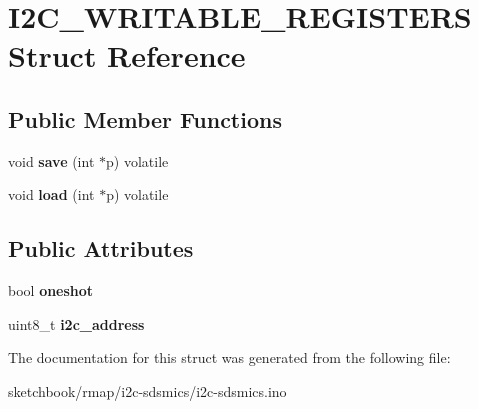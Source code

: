 \hypertarget{structI2C__WRITABLE__REGISTERS}{}\section{I2\+C\+\_\+\+W\+R\+I\+T\+A\+B\+L\+E\+\_\+\+R\+E\+G\+I\+S\+T\+E\+RS Struct Reference}
\label{structI2C__WRITABLE__REGISTERS}
\subsection*{Public Member Functions}
\begin{DoxyCompactItemize}
\item 
\mbox{\label{structI2C__WRITABLE__REGISTERS_a2770bbe96800efa86e42828a49b01b0d}} 
void {\bfseries save} (int $\ast$p) volatile
\item 
\mbox{\label{structI2C__WRITABLE__REGISTERS_abe6fdeaf87b81c96ed0059a918537e5b}} 
void {\bfseries load} (int $\ast$p) volatile
\end{DoxyCompactItemize}
\subsection*{Public Attributes}
\begin{DoxyCompactItemize}
\item 
\mbox{\label{structI2C__WRITABLE__REGISTERS_a17248fe8e6c649c63dc3c6eef81184cf}} 
bool {\bfseries oneshot}
\item 
\mbox{\label{structI2C__WRITABLE__REGISTERS_af77466345526d0a2ba938bd10fd50f47}} 
uint8\+\_\+t {\bfseries i2c\+\_\+address}
\end{DoxyCompactItemize}


The documentation for this struct was generated from the following file\+:\begin{DoxyCompactItemize}
\item 
sketchbook/rmap/i2c-\/sdsmics/i2c-\/sdsmics.\+ino\end{DoxyCompactItemize}
